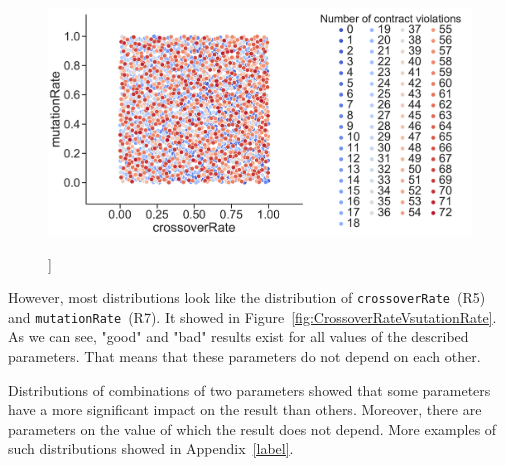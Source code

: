 \begin{figure}
	\centering
	\includegraphics[width=\textwidth]{images/CrossoverRateVsutationRate.pdf}
	\caption[]]{}
	\label{fig:CrossoverRateVmutationRate}
\end{figure}

However, most distributions look like the distribution of \texttt{crossoverRate}~(R5) and \texttt{mutationRate}~(R7). It showed in Figure~\ref{fig:CrossoverRateVsutationRate}. As we can see, "good" and "bad" results exist for all values of the described parameters. That means that these parameters do not depend on each other.

Distributions of combinations of two parameters showed that some parameters have a more significant impact on the result than others. Moreover, there are parameters on the value of which the result does not depend. More examples of such distributions showed in Appendix~\ref{label}.

